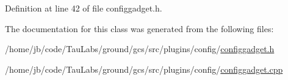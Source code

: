 \-Definition at line 42 of file configgadget.\-h.



\-The documentation for this class was generated from the following files\-:\begin{DoxyCompactItemize}
\item 
/home/jb/code/\-Tau\-Labs/ground/gcs/src/plugins/config/\hyperlink{configgadget_8h}{configgadget.\-h}\item 
/home/jb/code/\-Tau\-Labs/ground/gcs/src/plugins/config/\hyperlink{configgadget_8cpp}{configgadget.\-cpp}\end{DoxyCompactItemize}
